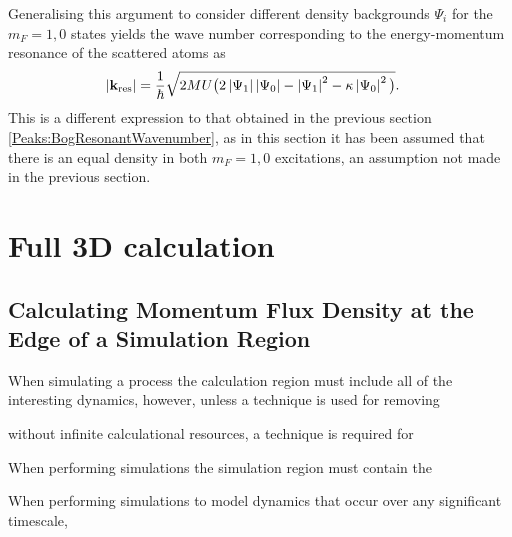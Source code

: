 Generalising this argument to consider different density backgrounds $\Psi_i$ for the $m_F=1, 0$ states yields the wave number corresponding to the energy-momentum resonance of the scattered atoms as
\begin{align}
    \abs{\mathbf{k}_\text{res}} &= \frac{1}{\hbar} \sqrt{2 M U \big(2 \abs{\Psi_1}\abs{\Psi_0} - \abs{\Psi_1}^2 - \kappa \abs{\Psi_0}^2\big)} \label{Peaks:ResonantWavenumber}.
\end{align}
This is a different expression to that obtained in the previous section \eqref{Peaks:BogResonantWavenumber}, as in this section it has been assumed that there is an equal density in both $m_F=1, 0$ excitations, an assumption not made in the previous section.



\section{Full 3D calculation}
\label{Peaks:3DCalculation}

\subsection{Calculating Momentum Flux Density at the Edge of a Simulation Region}
When simulating a process the calculation region must include all of the interesting dynamics, however, unless a technique is used for removing 

without infinite calculational resources, a technique is required for 


When performing simulations the simulation region must contain the 


When performing simulations to model dynamics that occur over any significant timescale, 
